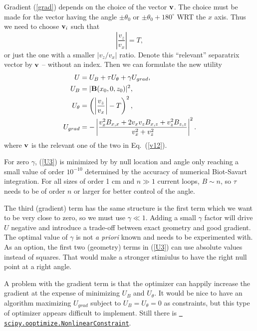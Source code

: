 \documentclass[10pt]{article}
\newcommand{\bfB}{{\bf B}}
\newcommand{\bfv}{{\bf v}}
\begin{document}
Gradient (\ref{grad}) depends on the choice of the vector $\bfv$.  The
choice must be made for the vector having the angle
$\pm\theta_0$ or $\pm\theta_0+180^\circ$ WRT the $x$ axis.
Thus we need to choose $\bfv_i$ such that
\begin{equation}
  \left|\frac{v_z}{v_x}\right| = T,
\end{equation}
or just the one with a smaller $|{v_z}/v_x|$ ratio.  Denote this
``relevant'' separatrix vector by $\bfv$ -- without an index.  Then we
can formulate the new utility
\begin{equation}
  \begin{aligned}
    U   &= U_B + \tau U_\theta + \gamma U_{grad},\\
    U_B &= |\bfB(x_0,0,z_0)|^2,\\
    U_\theta &= \left(\left|\frac{v_z}{v_x}\right| - T\right)^2,\\
    U_{grad} &= -\left|\frac{v_x^2B_{x,x} + 2v_xv_zB_{x,z}+v_z^2B_{z,z}}{v_x^2+v_z^2}\right|^2.
  \end{aligned}
  \label{U3}
\end{equation}
where $\bfv$ is the relevant one of the two in Eq.~(\ref{v12}).

For zero $\gamma$, (\ref{U3}) is minimized by by null location and
angle only reaching a small value of order $10^{-10}$ determined by
the accuracy of numerical Biot-Savart integration.  For all sizes of
order 1 cm and $n\gg1$ current loops, $B\sim n$, so $\tau$ needs to be
of order $n$ or larger for better control of the angle.

The third (gradient) term has the same structure is the first term
which we want to be very close to zero, so we must use $\gamma\ll1$.
Adding a small $\gamma$ factor will drive $U$ negative and introduce a
trade-off between exact geometry and good gradient.  The optimal value
of $\gamma$ is not {\em a priori} known and needs to be experimented
with.  As an option, the first two (geometry) terms in (\ref{U3}) can
use absolute values instead of squares.  That would make a stronger
stimiulus to have the right null point at a right angle.

A problem with the gradient term is that the optimizer can happily
increase the gradient at the expense of minimizing $U_B$ and
$U_\theta$.  It would be nice to have an algorithm maximizing
$U_{grad}$ subject to $U_B=U_\theta=0$ as constraints, but this type
of optimizer appears difficult to implement.  Still there is
\href{https://docs.scipy.org/doc/scipy/reference/generated/scipy.optimize.NonlinearConstraint.html}{\tt
    scipy.ooptimize.NonlinearConstraint}.
\end{document}
